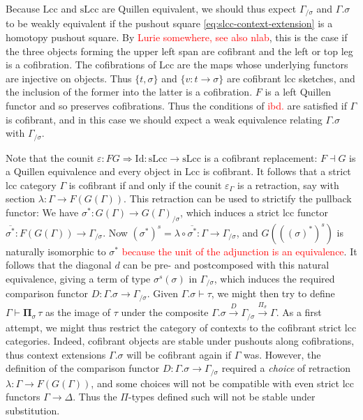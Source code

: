 \documentclass{article}
\newcommand{\todo}[1]{\textcolor{red}{#1}}
\theoremstyle{remark}
\theoremstyle{definition}
\begin{document}
Because $\mathrm{Lcc}$ and $\mathrm{sLcc}$ are Quillen equivalent, we should thus expect $\Gamma_{/ \sigma}$ and $\Gamma.\sigma$ to be weakly equivalent if the pushout square \eqref{eq:slcc-context-extension} is a homotopy pushout square.
By \todo{Lurie somewhere, see also nlab}, this is the case if the three objects forming the upper left span are cofibrant and the left or top leg is a cofibration.
The cofibrations of $\mathrm{Lcc}$ are the maps whose underlying functors are injective on objects.
Thus $\{t, \sigma\}$ and $\{ v : t \rightarrow \sigma\}$ are cofibrant lcc sketches, and the inclusion of the former into the latter is a cofibration.
$F$ is a left Quillen functor and so preserves cofibrations.
Thus the conditions of \todo{ibd.} are satisfied if $\Gamma$ is cofibrant, and in this case we should expect a weak equivalence relating $\Gamma.\sigma$ with $\Gamma_{/ \sigma}$.

Note that the counit $\varepsilon : FG \Rightarrow \mathrm{Id} : \mathrm{sLcc} \rightarrow \mathrm{sLcc}$ is a cofibrant replacement: $F \dashv G$ is a Quillen equivalence and every object in $\mathrm{Lcc}$ is cofibrant.
It follows that a strict lcc category $\Gamma$ is cofibrant if and only if the counit $\varepsilon_\Gamma$ is a retraction, say with section $\lambda : \Gamma \rightarrow F(G(\Gamma))$.
This retraction can be used to strictify the pullback functor:
We have $\sigma^* : G(\Gamma) \rightarrow G(\Gamma)_{/ \sigma}$, which induces a strict lcc functor $\overline{\sigma^*} : F(G(\Gamma)) \rightarrow \Gamma_{/ \sigma}$.
Now $(\sigma^*)^s = \lambda \circ \overline{\sigma^*} : \Gamma \rightarrow \Gamma_{/ \sigma}$, and $G(((\sigma)^*)^s)$ is naturally isomorphic to $\sigma^*$ \todo{because the unit of the adjunction is an equivalence}.
It follows that the diagonal $d$ can be pre- and postcomposed with this natural equivalence, giving a term of type $\sigma^s(\sigma)$ in $\Gamma_{/ \sigma}$, which induces the required comparison functor $D : \Gamma.\sigma \rightarrow \Gamma_{/ \sigma}$.
Given $\Gamma.\sigma \vdash \tau$, we might then try to define $\Gamma \vdash \mathbf{\Pi}_\sigma \, \tau$ as the image of $\tau$ under the composite $\Gamma.\sigma \xrightarrow{D} \Gamma_{/ \sigma} \xrightarrow{\Pi_\sigma} \Gamma$.
As a first attempt, we might thus restrict the category of contexts to the cofibrant strict lcc categories.
Indeed, cofibrant objects are stable under pushouts along cofibrations, thus context extensions $\Gamma.\sigma$ will be cofibrant again if $\Gamma$ was.
However, the definition of the comparison functor $D : \Gamma.\sigma \rightarrow \Gamma_{/ \sigma}$ required a \emph{choice} of retraction $\lambda : \Gamma \rightarrow F(G(\Gamma))$, and some choices will not be compatible with even strict lcc functors $\Gamma \rightarrow \Delta$.
Thus the $\Pi$-types defined such will not be stable under substitution.
\end{document}

